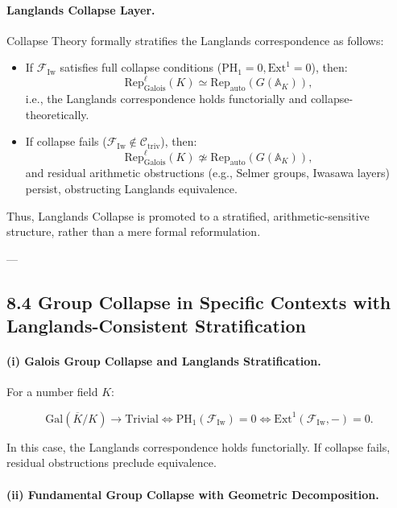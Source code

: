 \documentclass[11pt]{article}
\begin{document}
\paragraph{Langlands Collapse Layer.}

Collapse Theory formally stratifies the Langlands correspondence as follows:

\begin{itemize}
    \item If \( \mathcal{F}_{\mathrm{Iw}} \) satisfies full collapse conditions (\( \mathrm{PH}_1 = 0, \mathrm{Ext}^1 = 0 \)), then:
    \[
    \mathrm{Rep}_{\mathrm{Galois}}^\ell(K) \simeq \mathrm{Rep}_{\mathrm{auto}}(G(\mathbb{A}_K)),
    \]
    i.e., the Langlands correspondence holds functorially and collapse-theoretically.
    \item If collapse fails (\( \mathcal{F}_{\mathrm{Iw}} \notin \mathcal{C}_{\mathrm{triv}} \)), then:
    \[
    \mathrm{Rep}_{\mathrm{Galois}}^\ell(K) \not\simeq \mathrm{Rep}_{\mathrm{auto}}(G(\mathbb{A}_K)),
    \]
    and residual arithmetic obstructions (e.g., Selmer groups, Iwasawa layers) persist, obstructing Langlands equivalence.
\end{itemize}

Thus, Langlands Collapse is promoted to a stratified, arithmetic-sensitive structure, rather than a mere formal reformulation.

---

\subsection*{8.4 Group Collapse in Specific Contexts with Langlands-Consistent Stratification}

\paragraph{(i) Galois Group Collapse and Langlands Stratification.}

For a number field \( K \):

\[
\mathrm{Gal}(\overline{K}/K) \longrightarrow \mathrm{Trivial} \iff \mathrm{PH}_1(\mathcal{F}_{\mathrm{Iw}}) = 0 \iff \mathrm{Ext}^1(\mathcal{F}_{\mathrm{Iw}}, -) = 0.
\]

In this case, the Langlands correspondence holds functorially. If collapse fails, residual obstructions preclude equivalence.

\paragraph{(ii) Fundamental Group Collapse with Geometric Decomposition.}
\end{document}
